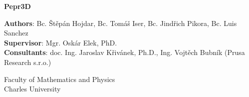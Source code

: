\documentclass[12pt,a4paper]{report}
\begin{document}
\begin{titlepage}
    \begin{center}
        \vspace*{1cm}
        
        \Huge
        \textbf{Pepr3D}

        \LARGE
        
        \vspace{12cm}
        
		\Large
        \textbf{Authors}: Bc. Štěpán Hojdar,
                Bc. Tomáš Iser,       
        Bc. Jindřich Pikora,
		Bc. Luis Sanchez
		\\
		\textbf{Supervisor}: Mgr. Oskár Elek, PhD.
		\\
		\textbf{Consultants}: doc. Ing. Jaroslav Křivánek, Ph.D., Ing. Vojtěch Bubník (Prusa Research s.r.o.)
        
        \vfill

		Faculty of Mathematics and Physics \\	
		Charles University		               
    \end{center}
\end{titlepage}

\tableofcontents




% 
% 
% 
% 
% 


\end{document}
